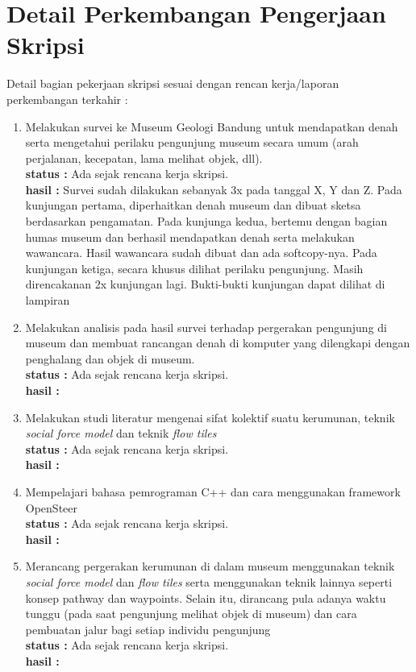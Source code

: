 \documentclass[a4paper,twoside]{article}
\begin{document}
\section{Detail Perkembangan Pengerjaan Skripsi}
Detail bagian pekerjaan skripsi sesuai dengan rencan kerja/laporan perkembangan terkahir :
	\begin{enumerate}
		\item Melakukan survei ke Museum Geologi Bandung untuk mendapatkan denah serta mengetahui perilaku pengunjung museum secara umum (arah perjalanan, kecepatan, lama melihat objek, dll).\\
		{\bf status :} Ada sejak rencana kerja skripsi.\\
		{\bf hasil :} Survei sudah dilakukan sebanyak 3x pada tanggal X, Y dan Z. Pada kunjungan pertama, diperhaitkan denah museum dan dibuat sketsa berdasarkan pengamatan. Pada kunjunga kedua, bertemu dengan bagian humas museum dan berhasil mendapatkan denah serta melakukan wawancara. Hasil wawancara sudah dibuat dan ada softcopy-nya. Pada kunjungan ketiga, secara khusus dilihat perilaku pengunjung. Masih direncakanan 2x kunjungan lagi. Bukti-bukti kunjungan dapat dilihat di lampiran
		
		\item Melakukan analisis pada hasil survei terhadap pergerakan pengunjung di museum dan membuat rancangan denah di komputer yang dilengkapi dengan penghalang dan objek di museum.\\
		{\bf status :} Ada sejak rencana kerja skripsi.\\
		{\bf hasil :}

		\item Melakukan studi literatur mengenai sifat kolektif suatu kerumunan, teknik {\it social force model} dan teknik {\it flow tiles}\\
		{\bf status :} Ada sejak rencana kerja skripsi.\\
		{\bf hasil :}

		\item Mempelajari bahasa pemrograman C++ dan cara menggunakan framework OpenSteer\\
		{\bf status :} Ada sejak rencana kerja skripsi.\\
		{\bf hasil :}

		\item Merancang pergerakan kerumunan di dalam museum menggunakan teknik {\it social force model} dan {\it flow tiles} serta menggunakan teknik lainnya seperti konsep pathway dan waypoints. Selain itu, dirancang pula adanya waktu tunggu (pada saat pengunjung melihat objek di museum) dan cara pembuatan jalur bagi setiap individu pengunjung\\
		{\bf status :} Ada sejak rencana kerja skripsi.\\
		{\bf hasil :}


\end{enumerate}
\end{document}
